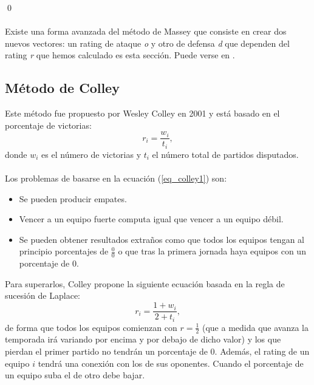 \qed
\ \\
\ \\
Existe una forma avanzada del método de Massey que consiste en crear dos nuevos vectores: un rating de ataque \textit{o} y otro de defensa \textit{d} que dependen del rating \textit{r} que hemos calculado es esta sección. Puede verse en \cite[págs 11-13]{libro_rankings}.

\subsection{Método de Colley}
Este método fue propuesto por Wesley Colley en 2001 y está basado en el porcentaje de victorias:\\
\begin{equation} \label{eq_colley1}
	r_{i} = \dfrac{w_{i}}{t_{i}},
\end{equation}
donde $w_{i}$ es el número de victorias y $t_{i}$ el número total de partidos disputados.\\
\\
Los problemas de basarse en la ecuación (\ref{eq_colley1}) son:
\begin{itemize}
	\item Se pueden producir empates.
	\item Vencer a un equipo fuerte computa igual que vencer a un equipo débil.
	\item Se pueden obtener resultados extraños como que todos los equipos tengan al principio porcentajes de $\frac{0}{0}$ o que tras la primera jornada haya equipos con un porcentaje de 0.  
\end{itemize}
Para superarlos, Colley propone la siguiente ecuación basada en la regla de sucesión de Laplace\cite{laplace}:
\begin{equation} \label{eq2.5}
	r_{i} = \dfrac{1+w_{i}}{2+t_{i}},
\end{equation}
de forma que todos los equipos comienzan con $r=\frac{1}{2}$ (que a medida que avanza la temporada irá variando por encima y por debajo de dicho valor) y los que pierdan el primer partido no tendrán un porcentaje de 0. Además, el rating de un equipo $i$ tendrá una conexión con los de sus oponentes. Cuando el porcentaje de un equipo suba el de otro debe bajar.\\

